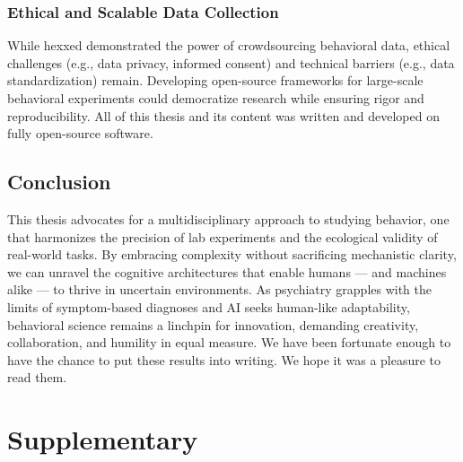 \documentclass[11pt]{article}
\begin{document}
    \subsubsection{Ethical and Scalable Data Collection}
    While hexxed demonstrated the power of crowdsourcing behavioral data, ethical challenges (e.g., data privacy, informed consent) and technical barriers (e.g., data standardization) remain. Developing open-source frameworks for large-scale behavioral experiments could democratize research while ensuring rigor and reproducibility. All of this thesis and its content was written and developed on fully open-source software.

\subsection{Conclusion}

This thesis advocates for a multidisciplinary approach to studying behavior, one that harmonizes the precision of lab experiments and the ecological validity of real-world tasks. By embracing complexity without sacrificing mechanistic clarity, we can unravel the cognitive architectures that enable humans — and machines alike — to thrive in uncertain environments. As psychiatry grapples with the limits of symptom-based diagnoses and AI seeks human-like adaptability, behavioral science remains a linchpin for innovation, demanding creativity, collaboration, and humility in equal measure. We have been fortunate enough to have the chance to put these results into writing. We hope it was a pleasure to read them.


\clearpage

\section{Supplementary}
\end{document}
